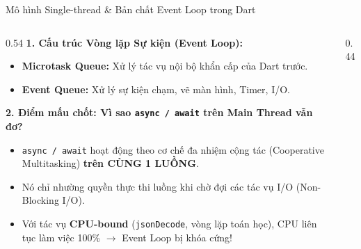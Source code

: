 \documentclass[aspectratio=169, 10pt]{beamer}
\begin{document}
\begin{frame}{Mô hình Single-thread \& Bản chất Event Loop trong Dart}
  \vspace{-0.15cm}
  \begin{columns}[c]
    \begin{column}{0.54\textwidth}
      \textbf{1. Cấu trúc Vòng lặp Sự kiện (Event Loop):}
      \begin{itemize}
        \item \textbf{Microtask Queue:} Xử lý tác vụ nội bộ khẩn cấp của Dart trước.
        \item \textbf{Event Queue:} Xử lý sự kiện chạm, vẽ màn hình, Timer, I/O.
      \end{itemize}
      \vspace{0.2cm}
      \textbf{2. Điểm mấu chốt: Vì sao \texttt{async / await} trên Main Thread vẫn đơ?}
      \begin{itemize}
        \item \texttt{async / await} hoạt động theo cơ chế đa nhiệm cộng tác (Cooperative Multitasking) \textbf{trên CÙNG 1 LUỒNG}.
        \item Nó chỉ nhường quyền thực thi luồng khi chờ đợi các tác vụ I/O (Non-Blocking I/O).
        \item Với tác vụ \textbf{CPU-bound} (\texttt{jsonDecode}, vòng lặp toán học), CPU liên tục làm việc 100\% $\rightarrow$ Event Loop bị khóa cứng!
      \end{itemize}
    \end{column}

    \begin{column}{0.44\textwidth}
      \centering
    \end{column}
  \end{columns}
\end{frame}
\end{document}
